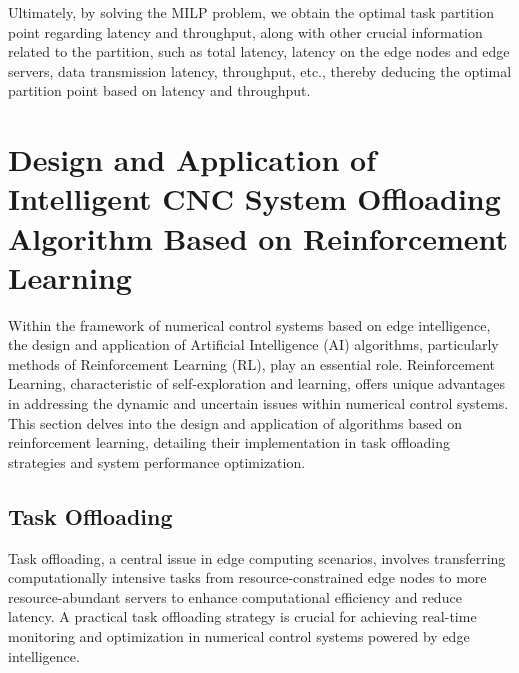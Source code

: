 \documentclass[preprint,12pt]{elsarticle}
\begin{document}
Ultimately, by solving the MILP problem, we obtain the optimal task partition point regarding latency and throughput, along with other crucial information related to the partition, such as total latency, latency on the edge nodes and edge servers, data transmission latency, throughput, etc., thereby deducing the optimal partition point based on latency and throughput.

\section{Design and Application of Intelligent CNC System Offloading Algorithm Based on Reinforcement Learning }

Within the framework of numerical control systems based on edge intelligence, the design and application of Artificial Intelligence (AI) algorithms, particularly methods of Reinforcement Learning (RL), play an essential role. Reinforcement Learning, characteristic of self-exploration and learning, offers unique advantages in addressing the dynamic and uncertain issues within numerical control systems. This section delves into the design and application of algorithms based on reinforcement learning, detailing their implementation in task offloading strategies and system performance optimization.

\subsection{Task Offloading}

Task offloading, a central issue in edge computing scenarios, involves transferring computationally intensive tasks from resource-constrained edge nodes to more resource-abundant servers to enhance computational efficiency and reduce latency. A practical task offloading strategy is crucial for achieving real-time monitoring and optimization in numerical control systems powered by edge intelligence.
\end{document}
